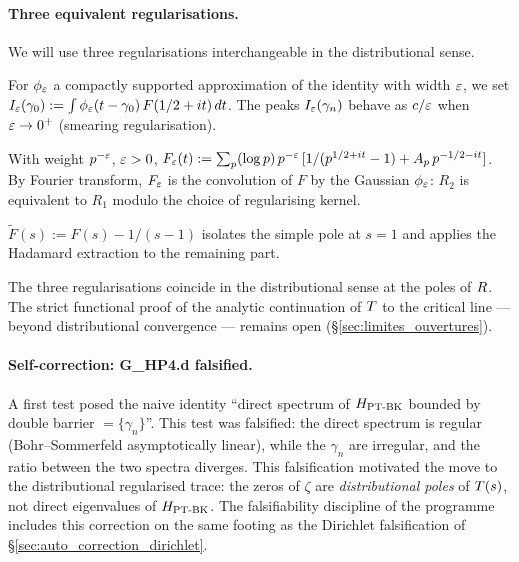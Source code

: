 \paragraph{Three equivalent regularisations.}
We will use three regularisations interchangeable in the distributional
sense.
\begin{description}[nosep,leftmargin=*]
\item[($R_1$) Smearing by test function.] For $\phi_\varepsilon$ a compactly
supported approximation of the identity with width $\varepsilon$, we set
$I_\varepsilon(\gamma_0) := \int \phi_\varepsilon(t - \gamma_0)\,F(1/2 + it)\,dt$.
The peaks $I_\varepsilon(\gamma_n)$ behave as $c/\varepsilon$ when $\varepsilon \to 0^{+}$
(smearing regularisation).
\item[($R_2$) Abel-Hadamard summation.] With weight $p^{-\varepsilon}$, $\varepsilon > 0$,
$F_\varepsilon(t) := \sum_p (\log p)\,p^{-\varepsilon}\,[1/(p^{1/2+it} - 1) + A_p\,p^{-1/2-it}]$.
By Fourier transform, $F_\varepsilon$ is the convolution of $F$ by the
Gaussian $\phi_\varepsilon$: $R_2$ is equivalent to $R_1$ modulo the choice
of regularising kernel.
\item[($R_3$) Subtraction of the principal pole.] $\widetilde F(s) := F(s) - 1/(s - 1)$
isolates the simple pole at $s = 1$ and applies the Hadamard extraction
to the remaining part.
\end{description}

The three regularisations coincide in the distributional sense at the
poles of $R$. The strict functional proof of the analytic
continuation of $T$ to the critical line --- beyond distributional
convergence --- remains open (\S\ref{sec:limites_ouvertures}).

\paragraph{Self-correction: G\_HP4.d falsified.}
A first test posed the naive identity ``direct spectrum of $H_{\mathrm{PT\text{-}BK}}$
bounded by double barrier $= \{\gamma_n\}$''. This test was
falsified: the direct spectrum is regular (Bohr--Sommerfeld
asymptotically linear), while the $\gamma_n$ are irregular, and
the ratio between the two spectra diverges. This falsification motivated
the move to the distributional regularised trace: the zeros of
$\zeta$ are \emph{distributional poles} of $T(s)$, not direct
eigenvalues of $H_{\mathrm{PT\text{-}BK}}$. The falsifiability discipline of the
programme includes this correction on the same footing as the
Dirichlet falsification of \S\ref{sec:auto_correction_dirichlet}.

